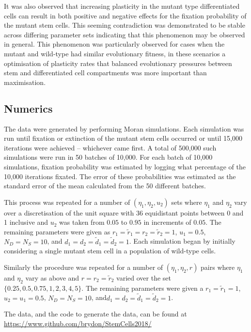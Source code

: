 \documentclass[12pt]{article}
\begin{document}
It was also observed that increasing plasticity in the mutant type differentiated cells can result in both positive and negative effects for the fixation probability of the mutant stem cells. This seeming contradiction was demonstrated to be stable across differing parameter sets indicating that this phenomenon may be observed in general. This phenomenon was particularly observed for cases when the mutant and wild-type had similar evolutionary fitness, in these scenarios a optimisation of plasticity rates that balanced evolutionary pressures between stem and differentiated cell compartments was more important than maximisation. 

\begin{appendices}

\section{Numerics}\label{exp}


The data were generated by performing Moran simulations. Each simulation was run until fixation or extinction of the mutant stem cells occurred or until 15,000 iterations were achieved -- whichever came first. A total of 500,000 such simulations were run in 50 batches of 10,000. For each batch of 10,000 simulations, fixation probability was estimated by logging what percentage of the 10,000 iterations fixated. The error of these probabilities was estimated as the standard error of the mean calculated from the 50 different batches. 

This process was repeated for a number of $(\eta_1, \eta_2, u_2)$ sets where $\eta_1$ and $\eta_2$ vary over a discretisation of the unit square with 36 equidistant points between 0 and 1 inclusive and $u_2$ was taken from $0.05$ to $0.95$ in increments of $0.05$. The remaining parameters were given as $r_1=\tilde{r}_1=r_2=\tilde{r}_2=1$, $u_1=0.5$, $N_D=N_S=10$, and $d_1=d_2=\tilde{d}_1=\tilde{d}_2=1$. Each simulation began by initially considering a single mutant stem cell in a population of wild-type cells.

Similarly the procedure was repeated for a number of $(\eta_1, \eta_2, r)$ pairs where $\eta_1$ and $\eta_2$ vary as above and $r=r_2=\tilde{r}_2$ varied over the set $\{0.25, 0.5, 0.75, 1, 2, 3, 4, 5\}$. The remaining parameters were given a $r_1=\tilde{r}_1=1$, $u_2=u_1=0.5$, $N_D=N_S=10$, and$d_1=d_2=\tilde{d}_1=\tilde{d}_2=1$.

The data, and the code to generate the data, can be found at \url{https://www.github.com/brydon/StemCells2018/}

\end{appendices}



\end{document}
